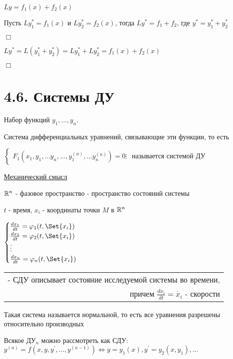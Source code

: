 \documentclass[12pt]{article}
\begin{document}
    \Th $Ly = f_1(x) + f_2(x)$

    Пусть $Ly_1^* = f_1(x)$ и $Ly^*_2 = f_2(x)$, тогда $Ly^* = f_1 + f_2$, где $y^* = y_1^* + y_2^*$

    $\Box$

    $Ly^* = L(y^*_1 + y^*_2) = Ly^*_1 + Ly^*_2 = f_1(x) + f_2(x)$

    $\Box$

    \section{4.6. Системы ДУ}

    \Def Набор функций $y_1, \dots, y_n$.

    Система дифференциальных уравнений, связывающие эти функции, то есть

    $\begin{cases}
         F_1(x_1, y_1, \dots y_n, \dots, y_1^{(n)}, \dots y_n^{(n)}) = 0
         \vdots
    \end{cases}$ называется системой ДУ

    \vspace{5mm}

    \underline{Механический смысл}

    $\mathbb{R}^n$ - фазовое пространство - пространство состояний системы

    $t$ - время, $x_i$ - координаты точки $M$ в $\mathbb{R}^n$

    $\begin{cases}
         \frac{dx_1}{dt} = \varphi_1(t, \Set{x_i}) \\
         \frac{dx_2}{dt} = \varphi_2(t, \Set{x_i}) \\
         \vdots \\
         \frac{dx_n}{dt} = \varphi_n(t, \Set{x_i}) \\
    \end{cases}$ \begin{tabular}{r} - СДУ описывает состояние исследуемой системы во времени, \\ причем $\frac{dx_i}{dt} = \dot{x_i}$ - скорости \end{tabular}

    \Nota Такая система называется нормальной, то есть все уравнения разрешены относительно производных

    \Nota Всякое ДУ$_n$ можно рассмотреть как СДУ: $y^{(n)} = f(x, y, y^\prime, \dots, y^{(n - 1)}) \Longleftrightarrow y = y_1(x), y^\prime = y_2(x, y_1), \dots$
\end{document}
